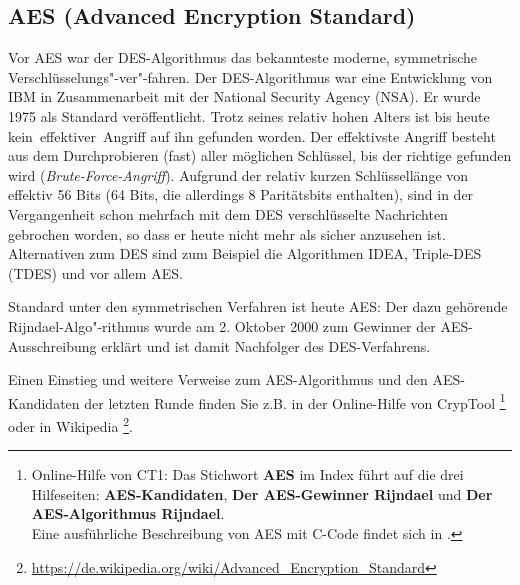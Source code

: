 \begin{refsegment}
\subsection[AES (Advanced Encryption Standard)]{AES (Advanced Encryption Standard)\footnotemark}
\label{CM_AES}

Vor AES war der DES-Algorithmus das bekannteste moderne, symmetrische
Verschlüsselungs"-ver"-fahren. Der DES-Algorithmus war eine Entwicklung von IBM
in Zusammenarbeit mit der National Security Agency  (NSA).
Er wurde 1975 als Standard veröffentlicht. Trotz seines relativ hohen
Alters ist bis heute kein~\glqq effektiver\grqq~Angriff auf
ihn gefunden worden. Der effektivste Angriff besteht aus dem Durchprobieren
(fast) aller möglichen Schlüssel, bis der richtige gefunden wird
({\em Brute-Force-Angriff}). Aufgrund der relativ
kurzen Schlüssellänge von effektiv 56 Bits (64 Bits, die allerdings 8
Paritätsbits enthalten), sind in der Vergangenheit schon mehrfach mit dem
DES verschlüsselte Nachrichten gebrochen worden, so dass er heute nicht
mehr als sicher anzusehen ist. Alternativen zum DES sind zum Beispiel die
Algorithmen IDEA, Triple-DES (TDES) und vor allem AES.

Standard unter den symmetrischen Verfahren ist heute AES:
Der dazu gehörende Rijndael-Algo"-rithmus wurde am 2. Oktober 2000 zum
Gewinner der AES-Ausschreibung erklärt und ist damit Nachfolger
des DES-Verfahrens.

Einen Einstieg und weitere Verweise zum AES-Algorithmus und den AES-Kandidaten
der letzten Runde finden Sie z.B. in der Online-Hilfe von
CrypTool%
\footnote{%
      Online-Hilfe von CT1: Das Stichwort \textbf{AES} im Index
      führt auf die drei Hilfeseiten: \textbf{AES-Kandidaten},
      \textbf{Der AES-Gewinner Rijndael} und \textbf{Der AES-Algorithmus Rijndael}.\\
      Eine ausführliche Beschreibung von AES mit C-Code findet sich
      in \cite{Haan2008}.
  }
oder in Wikipedia%
\footnote{%
	\url{https://de.wikipedia.org/wiki/Advanced_Encryption_Standard}
  }.



\end{refsegment}
